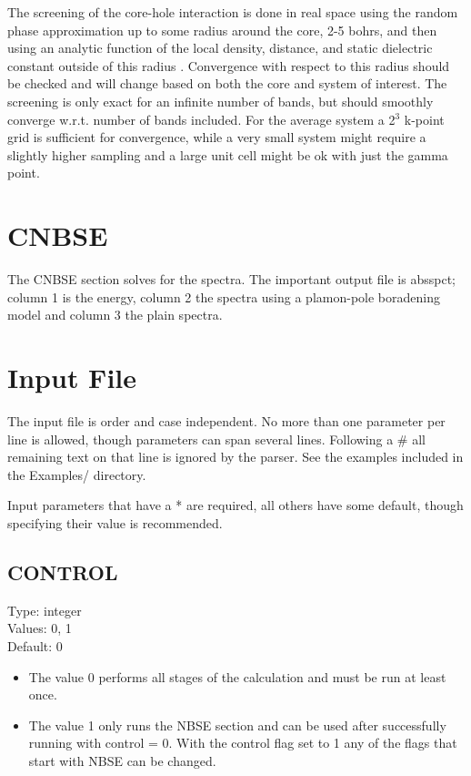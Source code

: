 \documentclass[12pt]{article}
\begin{document}
The screening of the core-hole interaction is done in real space using the random phase approximation up to 
some radius around the core, 2-5 bohrs, and then using an analytic function of the local density, distance, 
and static dielectric constant outside of this radius \cite{screening}. Convergence with respect to this radius should be 
checked and will change based on both the core and system of interest. The screening is only exact for an 
infinite number of bands, but should smoothly converge w.r.t. number of bands included. For the average 
system a 2$^3$ k-point grid is sufficient for convergence, while a very small system might require a 
slightly higher sampling and a large unit cell might be ok with just the gamma point.

\section{ CNBSE }
The CNBSE section solves for the spectra. The important output file is absspct; column 1 is the energy, 
column 2 the spectra using a plamon-pole boradening model and column 3 the plain spectra.

\section{Input File}
\label{sec:Control-Items}
The input file is order and case independent. No more than one parameter per line is allowed, though parameters can span several lines. Following a \# all remaining text on that line is ignored by the parser. See the examples included in the Examples/ directory.  

Input parameters that have a * are required, all others have some default, though specifying their value is recommended.

\subsection{CONTROL}
Type: integer \\
Values: 0, 1 \\
Default: 0
\begin{itemize}
\item The value 0 performs all stages of the calculation and must be run at least once. 

\item The value 1 only runs the \textsc{NBSE} section and can be used after successfully running with control = 0. With the control flag set to 1 any of the flags that start with NBSE can be changed.
\end{itemize}
\end{document}
